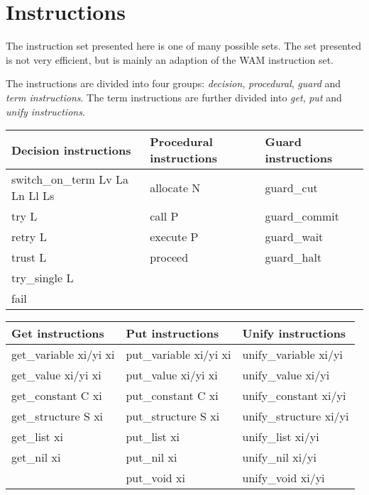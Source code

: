 \section{Instructions} \label{absinstr}

The instruction set presented here is one of many possible
sets. The set presented is not very efficient, but is mainly an
adaption of the WAM instruction set. 

The instructions are divided into four groups: {\em decision},
{\em procedural}, {\em guard} and {\em term instructions}. The term
instructions are further divided into {\em get}, {\em put} and {\em
unify instructions}.

\medskip
\begin{center}\begin{tabular}{|l|l|l|} \hline
Decision instructions & Procedural instructions & Guard instructions \\
\hline
switch\_on\_term Lv La Ln Ll Ls & allocate N	& guard\_cut \\
try L 				& call P	& guard\_commit \\
retry L 			& execute P     & guard\_wait \\
trust L 			& proceed 	& guard\_halt\\
try\_single L			&		& \\
fail         			&		& \\
\hline
\end{tabular} \end{center}

\medskip
\begin{center} \begin{tabular}{|l|l|l|} \hline
Get instructions & Put instructions & Unify instructions \\
\hline
get\_variable xi/yi xi  & put\_variable xi/yi xi        & unify\_variable xi/yi \\
get\_value xi/yi xi     & put\_value xi/yi xi           & unify\_value xi/yi \\
get\_constant C xi      & put\_constant C xi            & unify\_constant xi/yi \\
get\_structure S xi     & put\_structure S xi           & unify\_structure xi/yi \\
get\_list xi            & put\_list xi                  & unify\_list xi/yi  \\
get\_nil xi             & put\_nil xi                   & unify\_nil xi/yi \\
                        & put\_void xi                  & unify\_void xi/yi \\
\hline
\end{tabular} \end{center}


